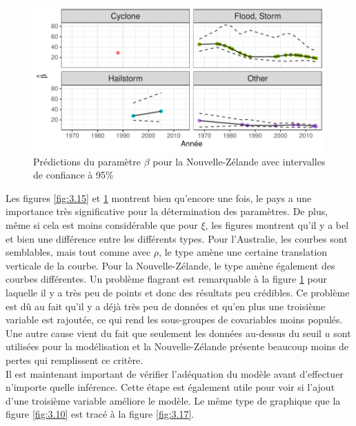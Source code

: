 \begin{figure}[h]
\begin{center}
\includegraphics{images/fig-028}
\end{center}
\caption{Prédictions du paramètre $\beta$ pour la Nouvelle-Zélande avec intervalles de confiance à 95\%}
\label{fig:3.16}
\end{figure}

Les figures \ref{fig:3.15} et \ref{fig:3.16} montrent bien qu'encore une fois, le pays a une importance très significative pour la détermination des paramètres. De plus, même si cela est moins considérable que pour $\xi$, les figures montrent qu'il y a bel et bien une différence entre les différents types. Pour l'Australie, les courbes sont semblables, mais tout comme avec $\rho$, le type amène une certaine translation verticale de la courbe. Pour la Nouvelle-Zélande, le type amène également des courbes différentes. Un problème flagrant est remarquable à la figure \ref{fig:3.16} pour laquelle il y a très peu de points et donc des résultats peu crédibles. Ce problème est dû au fait qu'il y a déjà très peu de données et qu'en plus une troisième variable est rajoutée, ce qui rend les sous-groupes de covariables moins populés. Une autre cause vient du fait que seulement les données au-dessus du seuil $u$ sont utilisées pour la modélisation et la Nouvelle-Zélande présente beaucoup moins de pertes qui remplissent ce critère.
\\

Il est maintenant important de vérifier l'adéquation du modèle avant d'effectuer n'importe quelle inférence. Cette étape est également utile pour voir si l'ajout d'une troisième variable améliore le modèle. Le même type de graphique que la figure \ref{fig:3.10} est tracé à la figure \ref{fig:3.17}. 




